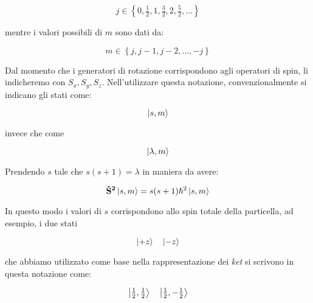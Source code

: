 	\begin{equation}
		j \in \left \{ 0, \tfrac{1}{2}, 1, \tfrac{3}{2}, 2, \tfrac{5}{2}, ... \right \}
	\end{equation}

mentre i valori possibili di $m$ sono dati da:

	\begin{equation}
		m \in \left \{ j, j-1, j-2, ..., -j \right \}
	\end{equation}

Dal momento che i generatori di rotazione corrispondono agli operatori di spin, li indicheremo con $S_x, S_y, S_z$. Nell'utilizzare questa notazione, convenzionalmente si indicano gli stati come:

	\[
		\ket{s, m}
	\]

invece che come

	\[
		\ket{\lambda, m}
	\]

Prendendo $s$ tale che $s(s+1) = \lambda$ in maniera da avere:

	\begin{equation}
		\mathbf{\hat{S}^2} \ket{s, m} = s(s+1) \hbar^2 \ket{s, m}
	\end{equation}

In questo modo i valori di $s$ corrispondono allo spin totale della particella, ad esempio, i due stati

	\[
		\ket{+z} \quad \ket{-z}
	\]

che abbiamo utilizzato come base nella rappresentazione dei \textit{ket} si scrivono in questa notazione come:

	\[
		\ket{\tfrac{1}{2}, \tfrac{1}{2}} \quad \ket{\tfrac{1}{2}, - \tfrac{1}{2}}
	\]
